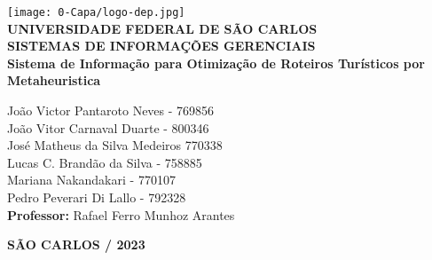 \justifying %
\onehalfspacing %
\setlength{\parindent}{0cm}  %
\renewcommand*\familydefault{\rmdefault}
\thispagestyle{empty}
\begin{center}
\texttt{[image: 0-Capa/logo-dep.jpg]}\\
\vspace*{.8cm}
{\huge \textbf{UNIVERSIDADE FEDERAL DE SÃO CARLOS}}\\
\vspace*{.8cm}
{\Large \textbf{SISTEMAS DE INFORMAÇÕES GERENCIAIS}}\\
\vspace*{3cm}
{\Large \textbf{Sistema de Informação para Otimização de Roteiros Turísticos por Metaheuristica}}\\
\vspace*{4.5cm}
\begin{flushright}
    \onehalfspacing
    {\Large  João Victor Pantaroto Neves - 769856}\\
    {\Large  João Vitor Carnaval Duarte - 800346}\\
    {\Large  José Matheus da Silva Medeiros 770338}\\
    {\Large  Lucas C. Brandão da Silva - 758885}\\
    {\Large  Mariana Nakandakari  - 770107}\\
    {\Large  Pedro Peverari Di Lallo  - 792328}\\
    \vspace*{.3cm}
    {\Large \textbf{Professor:}}
    {\Large Rafael Ferro Munhoz Arantes }\\
\end{flushright}
\vspace*{\fill}
{\large \bf SÃO CARLOS / 2023}
\end{center}
